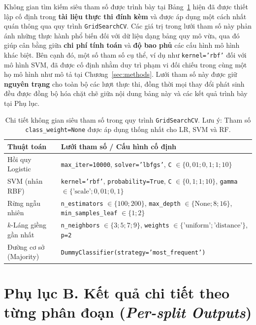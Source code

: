 \documentclass[14pt,a4paper]{extreport}
\begin{document}
Không gian tìm kiếm siêu tham số được trình bày tại Bảng~\ref{tab:hyper} hiện đã được thiết lập cố định trong \textbf{tài liệu thực thi đính kèm} và được áp dụng một cách nhất quán thông qua quy trình \texttt{GridSearchCV}. Các giá trị trong lưới tham số này phản ánh những thực hành phổ biến đối với dữ liệu dạng bảng quy mô vừa, qua đó giúp cân bằng giữa \textbf{chi phí tính toán} và \textbf{độ bao phủ} các cấu hình mô hình khác biệt. Bên cạnh đó, một số tham số cụ thể, ví dụ như \texttt{kernel='rbf'} đối với mô hình SVM, đã được cố định nhằm duy trì phạm vi đối chiếu trong cùng một họ mô hình như mô tả tại Chương~\ref{sec:methods}. Lưới tham số này được giữ \textbf{nguyên trạng} cho toàn bộ các lượt thực thi, đồng thời mọi thay đổi phát sinh đều được đồng bộ hóa chặt chẽ giữa nội dung bảng này và các kết quả trình bày tại Phụ lục.

\begin{table}[htbp]
  \centering
  \small
  \caption{Chi tiết không gian siêu tham số trong quy trình \texttt{GridSearchCV}. Lưu ý: Tham số \texttt{class\_weight=None} được áp dụng thống nhất cho LR, SVM và RF.}
  \label{tab:hyper}
  \begin{tabular}{lp{8.5cm}}
    \toprule
    \textbf{Thuật toán} & \textbf{Lưới tham số / Cấu hình cố định} \\
    \midrule
    Hồi quy Logistic & \texttt{max\_iter=10000}, \texttt{solver='lbfgs'}, \texttt{C} $\in \{0{,}01; 0{,}1; 1; 10\}$ \\
    SVM (nhân RBF) & \texttt{kernel='rbf'}, \texttt{probability=True}, \texttt{C} $\in \{0{,}1; 1; 10\}$, \texttt{gamma} $\in \{\text{'scale'}; 0{,}01; 0{,}1\}$ \\
    Rừng ngẫu nhiên & \texttt{n\_estimators} $\in \{100; 200\}$, \texttt{max\_depth} $\in \{\text{None}; 8; 16\}$, \texttt{min\_samples\_leaf} $\in \{1; 2\}$ \\
    $k$-Láng giềng gần nhất & \texttt{n\_neighbors} $\in \{3; 5; 7; 9\}$, \texttt{weights} $\in \{\text{'uniform'}; \text{'distance'}\}$, \texttt{p=2} \\
    Đường cơ sở (Majority) & \texttt{DummyClassifier(strategy='most\_frequent')} \\
    \bottomrule
  \end{tabular}
\end{table}

\label{app:per-split}
\section*{Phụ lục B. Kết quả chi tiết theo từng phân đoạn (\textit{Per-split Outputs})}
\end{document}
